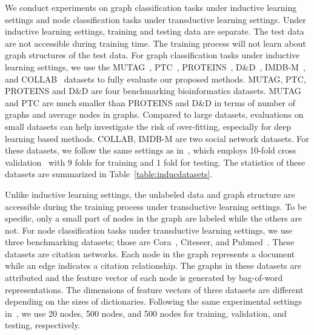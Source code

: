 \documentclass[sigconf]{acmart}
\begin{document}
We conduct experiments on graph classification tasks under inductive
learning settings and node classification tasks under transductive
learning settings. Under inductive learning settings, training and
testing data are separate. The test data are not accessible during
training time. The training process will not learn about graph
structures of the test data. For graph classification tasks under
inductive learning settings, we use the
MUTAG~\cite{niepert2016learning}, PTC~\cite{niepert2016learning},
PROTEINS~\cite{borgwardt2005protein},
D\&D~\cite{dobson2003distinguishing},
IMDB-M~\cite{yanardag2015structural}, and
COLLAB~\cite{yanardag2015structural} datasets to fully evaluate our
proposed methods. MUTAG, PTC, PROTEINS and D\&D are four
benchmarking bioinformatics datasets. MUTAG and PTC are much smaller
than PROTEINS and D\&D in terms of number of graphs and average
nodes in graphs. Compared to large datasets, evaluations on small
datasets can help investigate the risk of over-fitting, especially
for deep learning based methods. COLLAB, IMDB-M are two social
network datasets. For these datasets, we follow the same settings as
in~\cite{zhang2018end}, which employs 10-fold cross
validation~\cite{chang2011libsvm} with 9 folds for training and 1
fold for testing. The statistics of these datasets are summarized in
Table~\ref{table:inducdatasets}.


Unlike inductive learning settings, the unlabeled data and graph structure are
accessible during the training process under transductive learning settings.
To be specific, only a small part of nodes in the graph are labeled while the
others are not. For node classification tasks under transductive learning
settings, we use three benchmarking datasets; those are
Cora~\cite{sen2008collective}, Citeseer, and Pubmed~\cite{kipf2016semi}. These
datasets are citation networks. Each node in the graph represents a document
while an edge indicates a citation relationship. The graphs in these datasets
are attributed and the feature vector of each node is generated by bag-of-word
representations. The dimensions of feature vectors of three datasets are
different depending on the sizes of dictionaries. Following the same
experimental settings in~\cite{kipf2016semi}, we use 20 nodes, 500 nodes, and
500 nodes for training, validation, and testing, respectively.
\end{document}
